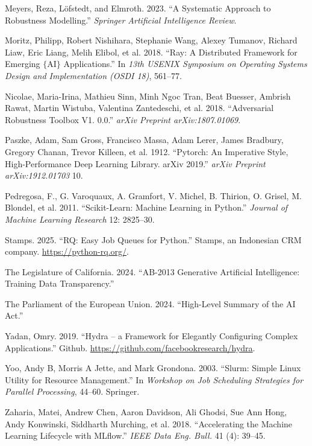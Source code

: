 \documentclass[
]{article}
\newlength{\cslhangindent}
\newlength{\cslentryspacingunit} %
\newenvironment{CSLReferences}[2] %
 {%
  \setlength{\parindent}{0pt}
  \ifodd #1
  \let\oldpar\par
  \def\par{\hangindent=\cslhangindent\oldpar}
  \fi
  \setlength{\parskip}{#2\cslentryspacingunit}
 }%
 {}
\begin{document}
\begin{CSLReferences}{1}{0}
\leavevmode{}%
Meyers, Reza, Löfstedt, and Elmroth. 2023. {``A Systematic Approach to
Robustness Modelling.''} \emph{Springer Artificial Intelligence Review}.

\leavevmode{}%
Moritz, Philipp, Robert Nishihara, Stephanie Wang, Alexey Tumanov,
Richard Liaw, Eric Liang, Melih Elibol, et al. 2018. {``Ray: A
Distributed Framework for Emerging \(\{\)AI\(\}\) Applications.''} In
\emph{13th USENIX Symposium on Operating Systems Design and
Implementation (OSDI 18)}, 561--77.

\leavevmode{}%
Nicolae, Maria-Irina, Mathieu Sinn, Minh Ngoc Tran, Beat Buesser,
Ambrish Rawat, Martin Wistuba, Valentina Zantedeschi, et al. 2018.
{``Adversarial Robustness Toolbox V1. 0.0.''} \emph{arXiv Preprint
arXiv:1807.01069}.

\leavevmode{}%
Paszke, Adam, Sam Gross, Francisco Massa, Adam Lerer, James Bradbury,
Gregory Chanan, Trevor Killeen, et al. 1912. {``Pytorch: An Imperative
Style, High-Performance Deep Learning Library. arXiv 2019.''}
\emph{arXiv Preprint arXiv:1912.01703} 10.

\leavevmode{}%
Pedregosa, F., G. Varoquaux, A. Gramfort, V. Michel, B. Thirion, O.
Grisel, M. Blondel, et al. 2011. {``Scikit-Learn: Machine Learning in
{P}ython.''} \emph{Journal of Machine Learning Research} 12: 2825--30.

\leavevmode{}%
Stamps. 2025. {``RQ: Easy Job Queues for Python.''} Stamps, an
Indonesian CRM company. \url{https://python-rq.org/}.

\leavevmode{}%
The Legislature of California. 2024. {``AB-2013 Generative Artificial
Intelligence: Training Data Transparency.''}

\leavevmode{}%
The Parliament of the European Union. 2024. {``High-Level Summary of the
AI Act.''}

\leavevmode{}%
Yadan, Omry. 2019. {``Hydra -- a Framework for Elegantly Configuring
Complex Applications.''} Github.
\url{https://github.com/facebookresearch/hydra}.

\leavevmode{}%
Yoo, Andy B, Morris A Jette, and Mark Grondona. 2003. {``Slurm: Simple
Linux Utility for Resource Management.''} In \emph{Workshop on Job
Scheduling Strategies for Parallel Processing}, 44--60. Springer.

\leavevmode{}%
Zaharia, Matei, Andrew Chen, Aaron Davidson, Ali Ghodsi, Sue Ann Hong,
Andy Konwinski, Siddharth Murching, et al. 2018. {``Accelerating the
Machine Learning Lifecycle with MLflow.''} \emph{IEEE Data Eng. Bull.}
41 (4): 39--45.

\end{CSLReferences}
\end{document}
